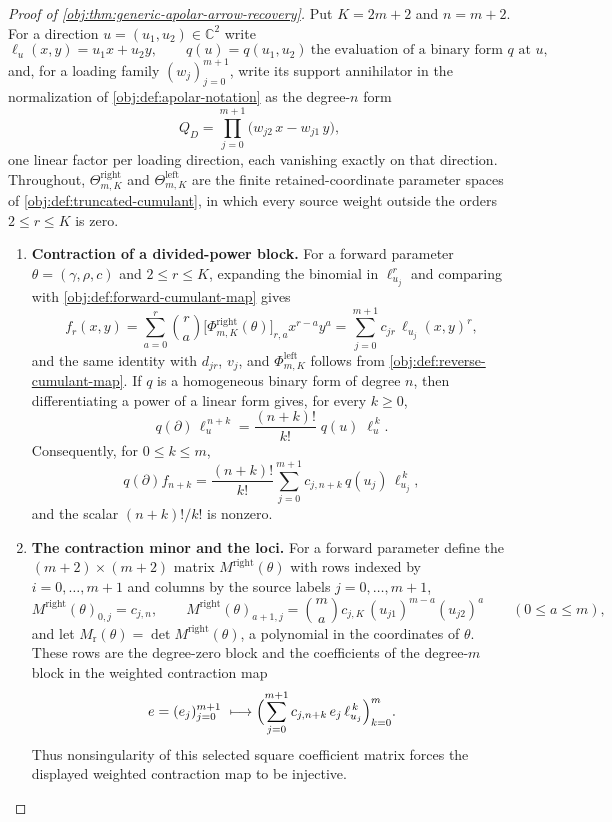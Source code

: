 \documentclass[11pt]{article}
\begin{document}
\begin{proof}[Proof of \cref{obj:thm:generic-apolar-arrow-recovery}]
Put \(K=2m+2\) and \(n=m+2\).  For a direction \(u=(u_1,u_2)\in\mathbb C^2\) write
\[
\ell_u(x,y)=u_1x+u_2y,
\qquad
q(u)=q(u_1,u_2)\ \text{the evaluation of a binary form }q\text{ at }u,
\]
and, for a loading family \((w_j)_{j=0}^{m+1}\), write its support annihilator in the normalization of \cref{obj:def:apolar-notation} as the degree-\(n\) form
\[
Q_D=\prod_{j=0}^{m+1}\bigl(w_{j2}\,x-w_{j1}\,y\bigr),
\]
one linear factor per loading direction, each vanishing exactly on that direction.  Throughout, \(\Theta^{\mathrm{right}}_{m,K}\) and \(\Theta^{\mathrm{left}}_{m,K}\) are the finite retained-coordinate parameter spaces of \cref{obj:def:truncated-cumulant}, in which every source weight outside the orders \(2\le r\le K\) is zero.

\begin{enumerate}
\item \textbf{Contraction of a divided-power block.}  For a forward parameter \(\theta=(\gamma,\rho,c)\) and \(2\le r\le K\), expanding the binomial in \(\ell_{u_j}^r\) and comparing with \cref{obj:def:forward-cumulant-map} gives
\[
f_r(x,y)=\sum_{a=0}^{r}\binom{r}{a}\bigl[\Phi^{\mathrm{right}}_{m,K}(\theta)\bigr]_{r,a}x^{r-a}y^{a}
=\sum_{j=0}^{m+1}c_{jr}\,\ell_{u_j}(x,y)^{r},
\]
and the same identity with \(d_{jr}\), \(v_j\), and \(\Phi^{\mathrm{left}}_{m,K}\) follows from \cref{obj:def:reverse-cumulant-map}.  If \(q\) is a homogeneous binary form of degree \(n\), then differentiating a power of a linear form gives, for every \(k\ge0\),
\[
q(\partial)\,\ell_u^{\,n+k}=\frac{(n+k)!}{k!}\;q(u)\;\ell_u^{\,k}.
\]
Consequently, for \(0\le k\le m\),
\[
q(\partial)f_{n+k}
=\frac{(n+k)!}{k!}\sum_{j=0}^{m+1}c_{j,n+k}\,q(u_j)\,\ell_{u_j}^{\,k},
\]
and the scalar \((n+k)!/k!\) is nonzero.

\item \textbf{The contraction minor and the loci.}  For a forward parameter define the \((m+2)\times(m+2)\) matrix \(M^{\mathrm{right}}(\theta)\) with rows indexed by \(i=0,\ldots,m+1\) and columns by the source labels \(j=0,\ldots,m+1\),
\[
M^{\mathrm{right}}(\theta)_{0,j}=c_{j,n},
\qquad
M^{\mathrm{right}}(\theta)_{a+1,j}=\binom{m}{a}c_{j,K}\,(u_{j1})^{m-a}(u_{j2})^{a}
\qquad(0\le a\le m),
\]
and let \(M_{\mathrm r}(\theta)=\det M^{\mathrm{right}}(\theta)\), a polynomial in the coordinates of \(\theta\).  These rows are the degree-zero block and the coefficients of the degree-\(m\) block in the weighted contraction map
\[
e=(e_j)_{j=0}^{m+1}\ \longmapsto
\Bigl(\sum_{j=0}^{m+1}c_{j,n+k}\,e_j\,\ell_{u_j}^{\,k}\Bigr)_{k=0}^{m}.
\]
Thus nonsingularity of this selected square coefficient matrix forces the displayed weighted contraction map to be injective.


\end{enumerate}
\end{proof}
\end{document}
